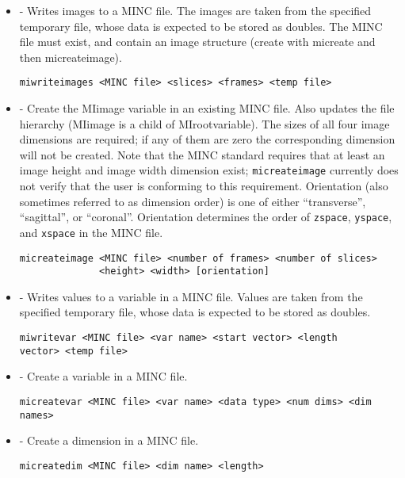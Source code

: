 \begin {itemize}

\item {} - Writes images to a MINC file.  The
images are taken from the specified temporary file, whose data is
expected to be stored as doubles.  The MINC file must exist, and
contain an image structure (create with micreate and then
micreateimage).
\begin{verbatim}
miwriteimages <MINC file> <slices> <frames> <temp file>
\end{verbatim}

\item {} - Create the MIimage variable in an
existing MINC file.  Also updates the file hierarchy (MIimage is a
child of MIrootvariable).  The sizes of all four image dimensions are
required; if any of them are zero the corresponding dimension will
not be created.  Note that the MINC standard requires that at least
an image height and image width dimension exist; \verb|micreateimage|
currently does not verify that the user is conforming to this
requirement.  Orientation (also sometimes referred to as dimension
order) is one of either ``transverse'', ``sagittal'', or ``coronal''.
Orientation determines the order of \verb|zspace|, \verb|yspace|, and
\verb|xspace| in the MINC file.
\begin{verbatim}
micreateimage <MINC file> <number of frames> <number of slices> 
              <height> <width> [orientation]
\end{verbatim}

\item {} - Writes values to a variable in a MINC file.  
Values are taken from the specified temporary file, whose data is
expected to be stored as doubles.
\begin{verbatim}
miwritevar <MINC file> <var name> <start vector> <length
vector> <temp file>
\end{verbatim}

\item {} - Create a variable in a MINC file.
\begin{verbatim}
micreatevar <MINC file> <var name> <data type> <num dims> <dim names>
\end{verbatim}

\item {} - Create a dimension in a MINC file.
\begin{verbatim}
micreatedim <MINC file> <dim name> <length>
\end{verbatim}


\end{itemize}
